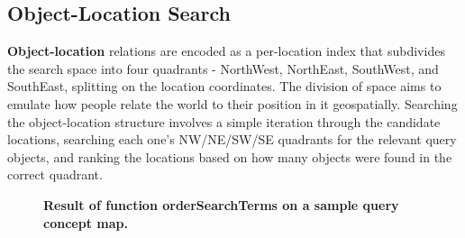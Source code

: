 


\subsection{Object-Location Search}
\textbf{Object-location} relations are encoded as a per-location index that subdivides the search space into four quadrants - NorthWest, NorthEast, SouthWest, and SouthEast, splitting on the location coordinates. The division of space aims to emulate how people relate the world to their position in it geospatially. 
Searching the object-location structure involves a simple iteration through the candidate locations, searching each one's NW/NE/SW/SE quadrants for the relevant query objects, and ranking the locations based on how many objects were found in the correct quadrant.





\begin{figure}[h]
    \centering
        
    \caption{\textbf{Result of function orderSearchTerms on a sample query concept map.}}\label{figure:compass_traversal-LO} 
\end{figure}


